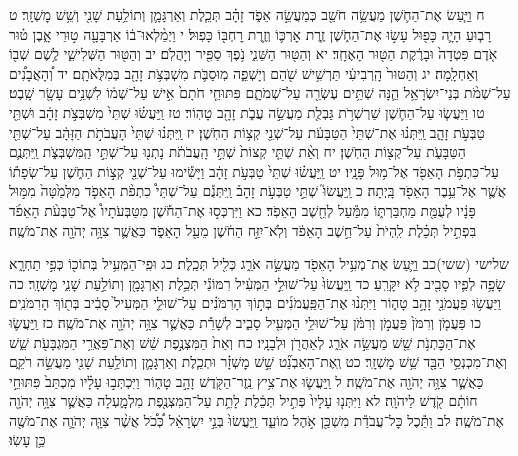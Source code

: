 \documentclass[twoside, openany, parskip=half, 11pt]{book}
\begin{document}
ח וַיַּ֧עַשׂ אֶת־הַחֹ֛שֶׁן מַעֲשֵׂ֥ה חֹשֵׁ֖ב כְּמַעֲשֵׂ֣ה אֵפֹ֑ד זָהָ֗ב תְּכֵ֧לֶת וְאַרְגָּמָ֛ן וְתוֹלַ֥עַת שָׁנִ֖י וְשֵׁ֥שׁ מׇשְׁזָֽר׃ ט רָב֧וּעַ הָיָ֛ה כָּפ֖וּל עָשׂ֣וּ אֶת־הַחֹ֑שֶׁן זֶ֧רֶת אׇרְכּ֛וֹ וְזֶ֥רֶת רׇחְבּ֖וֹ כָּפֽוּל׃ י וַיְמַ֨לְאוּ־ב֔וֹ אַרְבָּעָ֖ה ט֣וּרֵי אָ֑בֶן ט֗וּר אֹ֤דֶם פִּטְדָה֙ וּבָרֶ֔קֶת הַטּ֖וּר הָאֶחָֽד׃ יא וְהַטּ֖וּר הַשֵּׁנִ֑י נֹ֥פֶךְ סַפִּ֖יר וְיָהֲלֹֽם׃ יב וְהַטּ֖וּר הַשְּׁלִישִׁ֑י לֶ֥שֶׁם שְׁב֖וֹ וְאַחְלָֽמָה׃ יג וְהַטּוּר֙ הָֽרְבִיעִ֔י תַּרְשִׁ֥ישׁ שֹׁ֖הַם וְיָשְׁפֵ֑ה מֽוּסַבֹּ֛ת מִשְׁבְּצֹ֥ת זָהָ֖ב בְּמִלֻּאֹתָֽם׃ יד וְ֠הָאֲבָנִ֠ים עַל־שְׁמֹ֨ת בְּנֵי־יִשְׂרָאֵ֥ל הֵ֛נָּה שְׁתֵּ֥ים עֶשְׂרֵ֖ה עַל־שְׁמֹתָ֑ם פִּתּוּחֵ֤י חֹתָם֙ אִ֣ישׁ עַל־שְׁמ֔וֹ לִשְׁנֵ֥ים עָשָׂ֖ר שָֽׁבֶט׃ טו וַיַּעֲשׂ֧וּ עַל־הַחֹ֛שֶׁן שַׁרְשְׁרֹ֥ת גַּבְלֻ֖ת מַעֲשֵׂ֣ה עֲבֹ֑ת זָהָ֖ב טָהֽוֹר׃ טז וַֽיַּעֲשׂ֗וּ שְׁתֵּי֙ מִשְׁבְּצֹ֣ת זָהָ֔ב וּשְׁתֵּ֖י טַבְּעֹ֣ת זָהָ֑ב וַֽיִּתְּנ֗וּ אֶת־שְׁתֵּי֙ הַטַּבָּעֹ֔ת עַל־שְׁנֵ֖י קְצ֥וֹת הַחֹֽשֶׁן׃ יז וַֽיִּתְּנ֗וּ שְׁתֵּי֙ הָעֲבֹתֹ֣ת הַזָּהָ֔ב עַל־שְׁתֵּ֖י הַטַּבָּעֹ֑ת עַל־קְצ֖וֹת הַחֹֽשֶׁן׃ יח וְאֵ֨ת שְׁתֵּ֤י קְצוֹת֙ שְׁתֵּ֣י הָֽעֲבֹתֹ֔ת נָתְנ֖וּ עַל־שְׁתֵּ֣י הַֽמִּשְׁבְּצֹ֑ת וַֽיִּתְּנֻ֛ם עַל־כִּתְפֹ֥ת הָאֵפֹ֖ד אֶל־מ֥וּל פָּנָֽיו׃ יט וַֽיַּעֲשׂ֗וּ שְׁתֵּי֙ טַבְּעֹ֣ת זָהָ֔ב וַיָּשִׂ֕ימוּ עַל־שְׁנֵ֖י קְצ֣וֹת הַחֹ֑שֶׁן עַל־שְׂפָת֕וֹ אֲשֶׁ֛ר אֶל־עֵ֥בֶר הָאֵפֹ֖ד בָּֽיְתָה׃ כ וַֽיַּעֲשׂוּ֮ שְׁתֵּ֣י טַבְּעֹ֣ת זָהָב֒ וַֽיִּתְּנֻ֡ם עַל־שְׁתֵּי֩ כִתְפֹ֨ת הָאֵפֹ֤ד מִלְּמַ֙טָּה֙ מִמּ֣וּל פָּנָ֔יו לְעֻמַּ֖ת מַחְבַּרְתּ֑וֹ מִמַּ֕עַל לְחֵ֖שֶׁב הָאֵפֹֽד׃ כא וַיִּרְכְּס֣וּ אֶת־הַחֹ֡שֶׁן מִטַּבְּעֹתָיו֩ אֶל־טַבְּעֹ֨ת הָאֵפֹ֜ד בִּפְתִ֣יל תְּכֵ֗לֶת לִֽהְיֹת֙ עַל־חֵ֣שֶׁב הָאֵפֹ֔ד וְלֹֽא־יִזַּ֣ח הַחֹ֔שֶׁן מֵעַ֖ל הָאֵפֹ֑ד כַּאֲשֶׁ֛ר צִוָּ֥ה יְהֹוָ֖ה אֶת־מֹשֶֽׁה׃

שלישי (ששי)כב וַיַּ֛עַשׂ אֶת־מְעִ֥יל הָאֵפֹ֖ד מַעֲשֵׂ֣ה אֹרֵ֑ג כְּלִ֖יל תְּכֵֽלֶת׃ כג וּפִֽי־הַמְּעִ֥יל בְּתוֹכ֖וֹ כְּפִ֣י תַחְרָ֑א שָׂפָ֥ה לְפִ֛יו סָבִ֖יב לֹ֥א יִקָּרֵֽעַ׃ כד וַֽיַּעֲשׂוּ֙ עַל־שׁוּלֵ֣י הַמְּעִ֔יל רִמּוֹנֵ֕י תְּכֵ֥לֶת וְאַרְגָּמָ֖ן וְתוֹלַ֣עַת שָׁנִ֑י מׇשְׁזָֽר׃ כה וַיַּעֲשׂ֥וּ פַעֲמֹנֵ֖י זָהָ֣ב טָה֑וֹר וַיִּתְּנ֨וּ אֶת־הַפַּֽעֲמֹנִ֜ים בְּת֣וֹךְ הָרִמֹּנִ֗ים עַל־שׁוּלֵ֤י הַמְּעִיל֙ סָבִ֔יב בְּת֖וֹךְ הָרִמֹּנִֽים׃ כו פַּעֲמֹ֤ן וְרִמֹּן֙ פַּעֲמֹ֣ן וְרִמֹּ֔ן עַל־שׁוּלֵ֥י הַמְּעִ֖יל סָבִ֑יב לְשָׁרֵ֕ת כַּאֲשֶׁ֛ר צִוָּ֥ה יְהֹוָ֖ה אֶת־מֹשֶֽׁה׃
כז וַֽיַּעֲשׂ֛וּ אֶת־הַכׇּתְנֹ֥ת שֵׁ֖שׁ מַעֲשֵׂ֣ה אֹרֵ֑ג לְאַהֲרֹ֖ן וּלְבָנָֽיו׃ כח וְאֵת֙ הַמִּצְנֶ֣פֶת שֵׁ֔שׁ וְאֶת־פַּאֲרֵ֥י הַמִּגְבָּעֹ֖ת שֵׁ֑שׁ וְאֶת־מִכְנְסֵ֥י הַבָּ֖ד שֵׁ֥שׁ מׇשְׁזָֽר׃ כט וְֽאֶת־הָאַבְנֵ֞ט שֵׁ֣שׁ מׇשְׁזָ֗ר וּתְכֵ֧לֶת וְאַרְגָּמָ֛ן וְתוֹלַ֥עַת שָׁנִ֖י מַעֲשֵׂ֣ה רֹקֵ֑ם כַּאֲשֶׁ֛ר צִוָּ֥ה יְהֹוָ֖ה אֶת־מֹשֶֽׁה׃
ל וַֽיַּעֲשׂ֛וּ אֶת־צִ֥יץ נֵֽזֶר־הַקֹּ֖דֶשׁ זָהָ֣ב טָה֑וֹר וַיִּכְתְּב֣וּ עָלָ֗יו מִכְתַּב֙ פִּתּוּחֵ֣י חוֹתָ֔ם קֹ֖דֶשׁ לַיהֹוָֽה׃ לא וַיִּתְּנ֤וּ עָלָיו֙ פְּתִ֣יל תְּכֵ֔לֶת לָתֵ֥ת עַל־הַמִּצְנֶ֖פֶת מִלְמָ֑עְלָה כַּאֲשֶׁ֛ר צִוָּ֥ה יְהֹוָ֖ה אֶת־מֹשֶֽׁה׃
לב וַתֵּ֕כֶל כׇּל־עֲבֹדַ֕ת מִשְׁכַּ֖ן אֹ֣הֶל מוֹעֵ֑ד וַֽיַּעֲשׂוּ֙ בְּנֵ֣י יִשְׂרָאֵ֔ל כְּ֠כֹ֠ל אֲשֶׁ֨ר צִוָּ֧ה יְהֹוָ֛ה אֶת־מֹשֶׁ֖ה כֵּ֥ן עָשֽׂוּ׃
\end{document}
